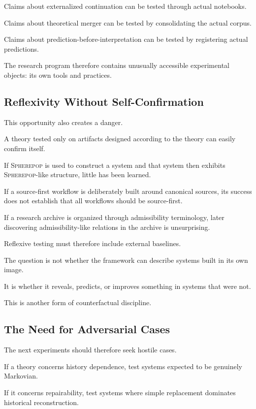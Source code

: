\documentclass[11pt]{article}
\theoremstyle{remark}
\newcommand{\Spherepop}{\textsc{Spherepop}}
\begin{document}
Claims about externalized continuation can be tested through actual notebooks.

Claims about theoretical merger can be tested by consolidating the actual
corpus.

Claims about prediction-before-interpretation can be tested by registering
actual predictions.

The research program therefore contains unusually accessible experimental
objects: its own tools and practices.

\subsection{Reflexivity Without Self-Confirmation}

This opportunity also creates a danger.

A theory tested only on artifacts designed according to the theory can easily
confirm itself.

If \Spherepop{} is used to construct a system and that system then exhibits
\Spherepop-like structure, little has been learned.

If a source-first workflow is deliberately built around canonical sources, its
success does not establish that all workflows should be source-first.

If a research archive is organized through admissibility terminology, later
discovering admissibility-like relations in the archive is unsurprising.

Reflexive testing must therefore include external baselines.

The question is not whether the framework can describe systems built in its own
image.

It is whether it reveals, predicts, or improves something in systems that were
not.

This is another form of counterfactual discipline.

\subsection{The Need for Adversarial Cases}

The next experiments should therefore seek hostile cases.

If a theory concerns history dependence, test systems expected to be genuinely
Markovian.

If it concerns repairability, test systems where simple replacement dominates
historical reconstruction.
\end{document}
